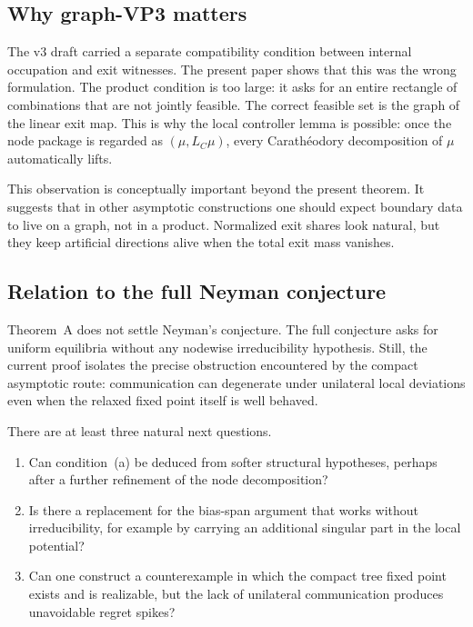 \documentclass[12pt]{article}
\theoremstyle{definition}
\newcommand{\1}{\mathbf{1}}
\begin{document}
\subsection{Why graph-VP3 matters}

The v3 draft carried a separate compatibility condition between internal occupation and
exit witnesses.  The present paper shows that this was the wrong formulation.  The product
condition is too large: it asks for an entire rectangle of combinations that are not
jointly feasible.  The correct feasible set is the graph of the linear exit map.  This is
why the local controller lemma is possible: once the node package is regarded as
\((\mu,L_C\mu)\), every Carath\'eodory decomposition of \(\mu\) automatically lifts.

This observation is conceptually important beyond the present theorem.  It suggests that in
other asymptotic constructions one should expect boundary data to live on a graph, not in
a product.  Normalized exit shares look natural, but they keep artificial directions alive
when the total exit mass vanishes.

\subsection{Relation to the full Neyman conjecture}

Theorem~A does not settle Neyman's conjecture.  The full conjecture asks for uniform
equilibria without any nodewise irreducibility hypothesis.  Still, the current proof
isolates the precise obstruction encountered by the compact asymptotic route:
communication can degenerate under unilateral local deviations even when the relaxed fixed
point itself is well behaved.

There are at least three natural next questions.

\begin{enumerate}[label=\textnormal{(\arabic*)},leftmargin=2.4em]
\item Can condition~(a) be deduced from softer structural hypotheses, perhaps after a
further refinement of the node decomposition?
\item Is there a replacement for the bias-span argument that works without irreducibility,
for example by carrying an additional singular part in the local potential?
\item Can one construct a counterexample in which the compact tree fixed point exists and
is realizable, but the lack of unilateral communication produces unavoidable regret spikes?
\end{enumerate}
\end{document}

